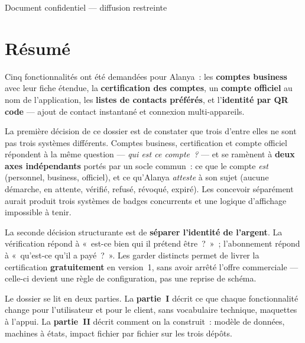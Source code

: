 \documentclass[11pt,a4paper,oneside]{report}
\begin{document}
\begin{titlepage}
\vspace{0.9cm}
\begin{center}\color{AlanyaGray}\small\sffamily
  Document confidentiel --- diffusion restreinte
\end{center}
\end{titlepage}

\chapter*{Résumé}
\thispagestyle{plain}

Cinq fonctionnalités ont été demandées pour Alanya~: les \textbf{comptes business} avec
leur fiche étendue, la \textbf{certification des comptes}, un \textbf{compte officiel} au nom
de l'application, les \textbf{listes de contacts préférés}, et l'\textbf{identité par QR
code} --- ajout de contact instantané et connexion multi-appareils.

La première décision de ce dossier est de constater que trois d'entre elles ne sont pas trois
systèmes différents. Comptes business, certification et compte officiel répondent à la même
question --- \emph{qui est ce compte~?} --- et se ramènent à \textbf{deux axes indépendants}
portés par un socle commun~: ce que le compte \emph{est} (personnel, business, officiel), et
ce qu'Alanya \emph{atteste} à son sujet (aucune démarche, en attente, vérifié, refusé,
révoqué, expiré). Les concevoir séparément aurait produit trois systèmes de badges
concurrents et une logique d'affichage impossible à tenir.

La seconde décision structurante est de \textbf{séparer l'identité de l'argent}. La
vérification répond à «~est-ce bien qui il prétend être~?~»~; l'abonnement répond à
«~qu'est-ce qu'il a payé~?~». Les garder distincts permet de livrer la certification
\textbf{gratuitement} en version~1, sans avoir arrêté l'offre commerciale --- celle-ci
devient une règle de configuration, pas une reprise de schéma.

Le dossier se lit en deux parties. La \textbf{partie~I} décrit ce que chaque fonctionnalité
change pour l'utilisateur et pour le client, sans vocabulaire technique, maquettes à l'appui.
La \textbf{partie~II} décrit comment on la construit~: modèle de données, machines à états,
impact fichier par fichier sur les trois dépôts.
\end{document}
